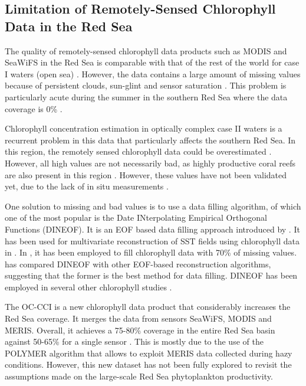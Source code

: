 \subsection{Limitation of Remotely-Sensed Chlorophyll Data in the Red Sea}

The quality of remotely-sensed chlorophyll data products such as MODIS and SeaWiFS in the Red Sea is comparable with that of the rest of the world for case I waters (open sea) \citep{Brewin2013}. However, the data contains a large amount of missing values because of persistent clouds, sun-glint and sensor saturation \citep{Racault}. This problem is particularly acute during the summer in the southern Red Sea where the data coverage is 0\% \citep{Racault}.

Chlorophyll concentration estimation in optically complex case II waters is a recurrent problem in this data that particularly affects the southern Red Sea. In this region, the remotely sensed chlorophyll data could be overestimated \citep{Raitsos2013}. However, all high values are not necessarily bad, as highly productive coral reefs are also present in this region \citep{Raitsos2013}. However, these values have not been validated yet, due to the lack of in situ measurements \citep{Raitsos2013}.

One solution to missing and bad values is to use a data filling algorithm, of which one of the most popular is the Date INterpolating Empirical Orthogonal Functions (DINEOF). It is an EOF based data filling approach introduced by \citet{Beckers2003}. It has been used for multivariate reconstruction of SST fields using chlorophyll data in \citet{Alvera2007}. In \citet{Sicarjobs2011}, it has been employed to fill chlorophyll data with 70\% of missing values. \citet{Taylor2013} has compared DINEOF with other EOF-based reconstruction algorithms, suggesting that the former is the best method for data filling. DINEOF has been employed in several other chlorophyll studies \citep{Miles2010, Waite2013}.

The OC-CCI is a new chlorophyll data product that considerably increases the Red Sea coverage. It merges the data from sensors SeaWiFS, MODIS and MERIS. Overall, it achieves a 75-80\% coverage in the entire Red Sea basin against 50-65\% for a single sensor \citep{Racault}. This is mostly due to the use of the POLYMER algorithm \citep{Steinmetz2011} that allows to exploit MERIS data collected during hazy conditions. However, this new dataset has not been fully explored to revisit the assumptions made on the large-scale Red Sea phytoplankton productivity.

